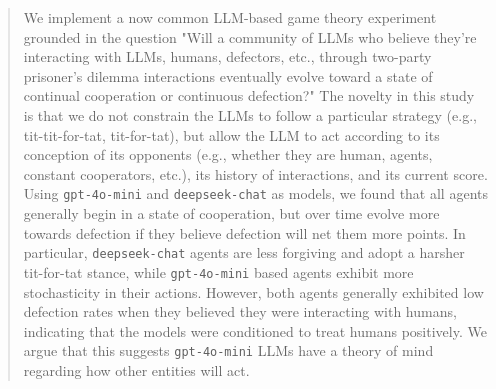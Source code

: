 \documentclass[%
 reprint,
 amsmath,amssymb,
 aps,
]{revtex4-2}
\begin{document}
\date{\today}%
\begin{abstract}
We implement a now common LLM-based game theory experiment grounded in the question "Will a community of LLMs who believe they're interacting with LLMs, humans, defectors, etc., through two-party prisoner’s dilemma interactions eventually evolve toward a state of continual cooperation or continuous defection?" The novelty in this study is that we do not constrain the LLMs to follow a particular strategy (e.g., tit-tit-for-tat, tit-for-tat), but allow the LLM to act according to its conception of its opponents (e.g., whether they are human, agents, constant cooperators, etc.), its history of interactions, and its current score. Using \texttt{gpt-4o-mini} and \texttt{deepseek-chat} as models, we found that all agents generally begin in a state of cooperation, but over time evolve more towards defection if they believe defection will net them more points. In particular, \texttt{deepseek-chat} agents are less forgiving and adopt a harsher tit-for-tat stance, while \texttt{gpt-4o-mini} based agents exhibit more stochasticity in their actions. However, both agents generally exhibited low defection rates when they believed they were interacting with humans, indicating that the models were conditioned to treat humans positively. We argue that this suggests \texttt{gpt-4o-mini} LLMs have a theory of mind regarding how other entities will act. 


\maketitle



\end{abstract}
\end{document}
